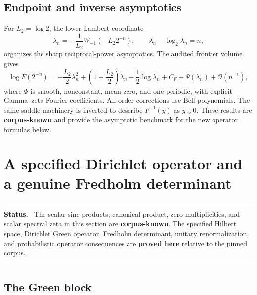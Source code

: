 \documentclass[11pt,oneside]{article}
\theoremstyle{definition}
\newcommand{\bigO}{\mathcal O}
\newcommand{\CorpusKnown}{\textcolor{linkblue}{\textbf{corpus-known}}}
\newcommand{\ProvedHere}{\textcolor{deepgreen}{\textbf{proved here}}}
\newenvironment{statusbox}[1]{%
  \par\medskip\begin{center}\begin{minipage}{0.94\textwidth}%
  \hrule\medskip\textbf{#1.}\ }%
  {\par\medskip\hrule\end{minipage}\end{center}\medskip}
\begin{document}
\subsection{Endpoint and inverse asymptotics}

For \(L_2=\log2\), the lower-Lambert coordinate
\begin{equation}
 \lambda_n=-\frac1{L_2}W_{-1}(-L_2 2^{-n}),
 \qquad \lambda_n-\log_2\lambda_n=n,
 \label{p1:eq:lambda-n}
\end{equation}
organizes the sharp reciprocal-power asymptotics.  The audited frontier volume gives
\begin{equation}
 \log F(2^{-n})
 =-\frac{L_2}{2}\lambda_n^2
 +\left(1+\frac{L_2}{2}\right)\lambda_n
 -\frac12\log\lambda_n+C_F+\Psi(\lambda_n)+\bigO(n^{-1}),
 \label{p1:eq:sharp-dyadic-asymptotic}
\end{equation}
where \(\Psi\) is smooth, nonconstant, mean-zero, and one-periodic, with explicit
Gamma--zeta Fourier coefficients.  All-order corrections use Bell polynomials.  The
same saddle machinery is inverted to describe \(F^{-1}(y)\) as \(y\downarrow0\).
These results are \CorpusKnown{} and provide the asymptotic benchmark for the new
operator formulas below.

\section{A specified Dirichlet operator and a genuine Fredholm determinant}
\label{p1:sec:operator}

\begin{statusbox}{Status}
The scalar sinc products, canonical product, zero multiplicities, and scalar spectral
zeta in this section are \CorpusKnown{}.  The specified Hilbert space, Dirichlet Green
operator, Fredholm determinant, unitary renormalization, and probabilistic operator
consequences are \ProvedHere{} relative to the pinned corpus.
\end{statusbox}

\subsection{The Green block}
\end{document}
